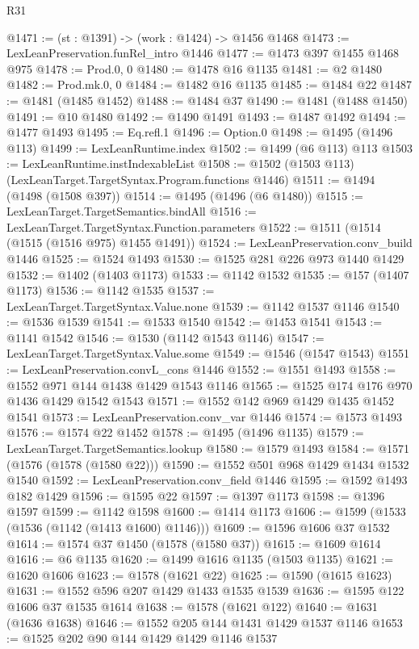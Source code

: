 \begin{lexlean}{R31}
\begin{coremodule}
@1471 := (st : @1391) -> (work : @1424) -> @1456 @1468
@1473 := LexLeanPreservation.funRel_intro @1446
@1477 := @1473 @397 @1455 @1468 @975
@1478 := Prod.{0, 0}
@1480 := @1478 @16 @1135
@1481 := @2 @1480
@1482 := Prod.mk.{0, 0}
@1484 := @1482 @16 @1135
@1485 := @1484 @22
@1487 := @1481 (@1485 @1452)
@1488 := @1484 @37
@1490 := @1481 (@1488 @1450)
@1491 := @10 @1480
@1492 := @1490 @1491
@1493 := @1487 @1492
@1494 := @1477 @1493
@1495 := Eq.refl.{1}
@1496 := Option.{0}
@1498 := @1495 (@1496 @113)
@1499 := LexLeanRuntime.index
@1502 := @1499 (@6 @113) @113
@1503 := LexLeanRuntime.instIndexableList
@1508 := @1502 (@1503 @113) (LexLeanTarget.TargetSyntax.Program.functions @1446)
@1511 := @1494 (@1498 (@1508 @397))
@1514 := @1495 (@1496 (@6 @1480))
@1515 := LexLeanTarget.TargetSemantics.bindAll
@1516 := LexLeanTarget.TargetSyntax.Function.parameters
@1522 := @1511 (@1514 (@1515 (@1516 @975) @1455 @1491))
@1524 := LexLeanPreservation.conv_build @1446
@1525 := @1524 @1493
@1530 := @1525 @281 @226 @973 @1440 @1429
@1532 := @1402 (@1403 @1173)
@1533 := @1142 @1532
@1535 := @157 (@1407 @1173)
@1536 := @1142 @1535
@1537 := LexLeanTarget.TargetSyntax.Value.none
@1539 := @1142 @1537 @1146
@1540 := @1536 @1539
@1541 := @1533 @1540
@1542 := @1453 @1541
@1543 := @1141 @1542
@1546 := @1530 (@1142 @1543 @1146)
@1547 := LexLeanTarget.TargetSyntax.Value.some
@1549 := @1546 (@1547 @1543)
@1551 := LexLeanPreservation.convL_cons @1446
@1552 := @1551 @1493
@1558 := @1552 @971 @144 @1438 @1429 @1543 @1146
@1565 := @1525 @174 @176 @970 @1436 @1429 @1542 @1543
@1571 := @1552 @142 @969 @1429 @1435 @1452 @1541
@1573 := LexLeanPreservation.conv_var @1446
@1574 := @1573 @1493
@1576 := @1574 @22 @1452
@1578 := @1495 (@1496 @1135)
@1579 := LexLeanTarget.TargetSemantics.lookup
@1580 := @1579 @1493
@1584 := @1571 (@1576 (@1578 (@1580 @22)))
@1590 := @1552 @501 @968 @1429 @1434 @1532 @1540
@1592 := LexLeanPreservation.conv_field @1446
@1595 := @1592 @1493 @182 @1429
@1596 := @1595 @22
@1597 := @1397 @1173
@1598 := @1396 @1597
@1599 := @1142 @1598
@1600 := @1414 @1173
@1606 := @1599 (@1533 (@1536 (@1142 (@1413 @1600) @1146)))
@1609 := @1596 @1606 @37 @1532
@1614 := @1574 @37 @1450 (@1578 (@1580 @37))
@1615 := @1609 @1614
@1616 := @6 @1135
@1620 := @1499 @1616 @1135 (@1503 @1135)
@1621 := @1620 @1606
@1623 := @1578 (@1621 @22)
@1625 := @1590 (@1615 @1623)
@1631 := @1552 @596 @207 @1429 @1433 @1535 @1539
@1636 := @1595 @122 @1606 @37 @1535 @1614
@1638 := @1578 (@1621 @122)
@1640 := @1631 (@1636 @1638)
@1646 := @1552 @205 @144 @1431 @1429 @1537 @1146
@1653 := @1525 @202 @90 @144 @1429 @1429 @1146 @1537

\end{coremodule}
\end{lexlean}
